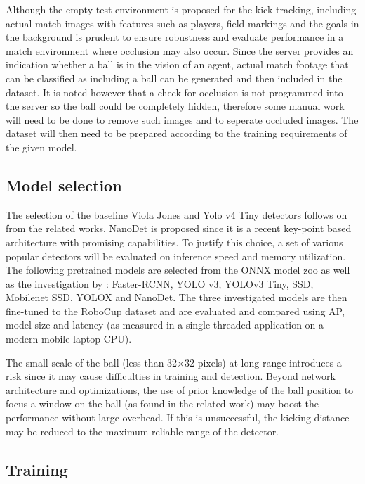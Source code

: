 \documentclass[a4paper,twoside,12pt]{report}
\begin{document}
Although the empty test environment is proposed for the kick tracking, including actual match images with features such as players, field markings and the goals in the background is prudent to ensure robustness and evaluate performance in a match environment where occlusion may also occur. Since the server provides an indication whether a ball is in the vision of an agent, actual match footage that can be classified as including a ball can be generated and then included in the dataset. It is noted however that a check for occlusion is not programmed into the server so the ball could be completely hidden, therefore some manual work will need to be done to remove such images and to seperate occluded images. The dataset will then need to be prepared according to the training requirements of the given model.

\subsection{Model selection}

The selection of the baseline Viola Jones and Yolo v4 Tiny detectors follows on from the related works. NanoDet is proposed since it is a recent key-point based architecture with promising capabilities. To justify this choice, a set of various popular detectors will be evaluated on inference speed and memory utilization. The following pretrained models are selected from the ONNX model zoo \citep{modelzoo} as well as the investigation by \cite{comprehensive}: Faster-RCNN, YOLO v3, YOLOv3 Tiny, SSD, Mobilenet SSD, YOLOX and NanoDet. The three investigated models are then fine-tuned to the RoboCup dataset and are evaluated and compared using AP, model size and latency (as measured in a single threaded application on a modern mobile laptop CPU).

The small scale of the ball (less than 32×32 pixels) at long range introduces a risk since it may cause difficulties in training and detection. Beyond network architecture and optimizations, the use of prior knowledge of the ball position to focus a window on the ball (as found in the related work) may boost the performance without large overhead. If this is unsuccessful, the kicking distance may be reduced to the maximum reliable range of the detector.

\subsection{Training}
\end{document}
